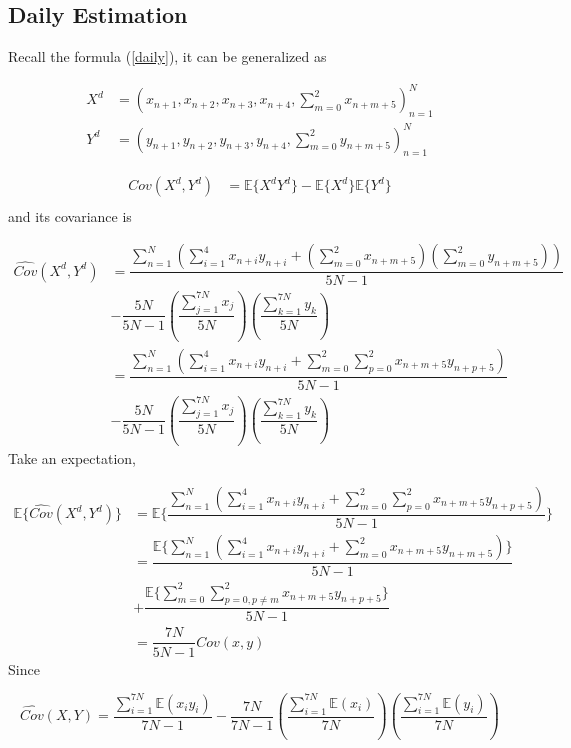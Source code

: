 \documentclass{article}[a4]
\begin{document}
\subsection{Daily Estimation}
Recall the formula (\ref{daily}), it can be generalized as \par 
\begin{equation}
\begin{aligned}
X^{d}&=({x_{n+1}, x_{n+2}, x_{n+3},x_{n+4},\sum_{m=0}^{2}x_{n+m+5}})_{n=1}^{N}\\
Y^{d}&=({y_{n+1}, y_{n+2}, y_{n+3},y_{n+4},\sum_{m=0}^{2}y_{n+m+5}})_{n=1}^{N}
\end{aligned}
\end{equation}\par 
\begin{equation}
\begin{aligned}
Cov(X^{d},Y^{d})&=\mathbb{E}\{X^{d}Y^{d}\} - \mathbb{E}\{X^{d}\}\mathbb{E}\{Y^{d}\} \\
\end{aligned}
\end{equation}
and its covariance is\par 
\begin{equation}
\begin{aligned}
\hat{Cov}(X^{d},Y^{d}) &= \dfrac{\sum_{n=1}^{N}\left(\sum_{i=1}^{4}x_{n+i}y_{n+i} + (\sum_{m=0}^{2}x_{n+m+5})(\sum_{m=0}^{2}y_{n+m+5})\right)}{5N-1} \\ &-\dfrac{5N}{5N-1}\left(\dfrac{\sum_{j=1}^{7N}x_{j}}{5N}\right)\left(\dfrac{\sum_{k=1}^{7N}y_{k}}{5N}\right)\\
&= \dfrac{\sum_{n=1}^{N}\left(\sum_{i=1}^{4}x_{n+i}y_{n+i} + \sum_{m=0}^{2}\sum_{p=0}^{2}x_{n+m+5}y_{n+p+5}\right)}{5N-1} \\ &-\dfrac{5N}{5N-1}\left(\dfrac{\sum_{j=1}^{7N}x_{j}}{5N}\right)\left(\dfrac{\sum_{k=1}^{7N}y_{k}}{5N}\right)
\end{aligned}
\end{equation}
Take an expectation,\par 
\begin{equation}
\begin{aligned}
\mathbb{E}\{\hat{Cov}(X^{d},Y^{d})\} &=\mathbb{E}\{\dfrac{\sum_{n=1}^{N}\left(\sum_{i=1}^{4}x_{n+i}y_{n+i} + \sum_{m=0}^{2}\sum_{p=0}^{2}x_{n+m+5}y_{n+p+5}\right)}{5N-1}\}\\
&=\dfrac{\mathbb{E}\{\sum_{n=1}^{N}\left(\sum_{i=1}^{4}x_{n+i}y_{n+i} + \sum_{m=0}^{2}x_{n+m+5}y_{n+m+5} \right)\}}{5N-1}\\
&+\dfrac{\mathbb{E}\{\sum_{m=0}^{2}\sum_{p=0,p\neq m}^{2}x_{n+m+5}y_{n+p+5}\}}{5N-1}\\
& = \dfrac{7N}{5N-1}Cov(x,y)
\end{aligned}
\end{equation}
Since \par 
\begin{equation}
\hat{Cov}(X,Y) = \dfrac{\sum_{i=1}^{7N}\mathbb{E}(x_{i}y_{i})}{7N-1} - \dfrac{7N}{7N-1}\left(\dfrac{\sum_{i=1}^{7N}\mathbb{E}(x_{i})}{7N}\right)\left(\dfrac{\sum_{i=1}^{7N}\mathbb{E}(y_{i})}{7N}\right)
\end{equation}
\end{document}
